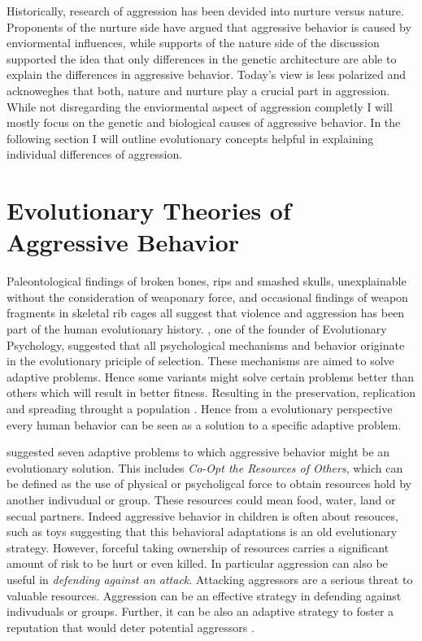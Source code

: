 Historically, research of aggression has been devided into nurture versus nature\cite{Archer2009}. 
Proponents of the nurture side have argued that aggressive behavior is caused by enviormental influences, while supports of the nature side of the discussion supported the idea that only differences in the genetic architecture are able to explain the differences in aggressive behavior.
Today's view is less polarized and acknoweghes that both, nature and nurture play a crucial part in aggression.
While not disregarding the enviormental aspect of aggression completly I will mostly focus on the genetic and biological causes of aggressive behavior.
In the following section I will outline evolutionary concepts helpful in explaining individual differences of aggression. 

\section{Evolutionary Theories of Aggressive Behavior}
\label{sec:evolutionary_theories_on_aggressive_behavior}

Paleontological findings of broken bones, rips and smashed skulls, unexplainable without the consideration of weaponary force, and occasional findings of weapon fragments in skeletal rib cages all suggest that violence and aggression has been part of the human evolutionary history. 
\citet{Buss1997}, one of the founder of Evolutionary Psychology, suggested that all psychological mechanisms and behavior originate in the evolutionary priciple of selection.  
These mechanisms are aimed to solve adaptive problems.
Hence some variants might solve certain problems better than others which will result in better fitness.
Resulting in the preservation, replication and spreading throught a population \cite{Buss1997}.
Hence from a evolutionary perspective every human behavior can be seen as a solution to a specific adaptive problem.

\citet{Buss1997} suggested seven adaptive problems to which aggressive behavior might be an evolutionary solution.
This includes \textit{Co-Opt the Resources of Others}, which can be defined as the use of physical or psycholigcal force to obtain resources hold by another indivudual or group.
These resources could mean food, water, land or secual partners.
Indeed aggressive behavior in children is often about resouces, such as toys \cite{Campbell1995} suggesting that this behavioral adaptations is an old evelutionary strategy.
However, forceful taking ownership of resources carries a significant amount of risk to be hurt or even killed.
In particular aggression can also be  useful in \textit{defending against an attack}.
Attacking aggressors are a serious threat to valuable resources.
Aggression can be an effective strategy in defending against indivuduals or groups.
Further, it can be also an adaptive strategy to foster a reputation that would deter potential aggressors \cite{Buss1997}.

